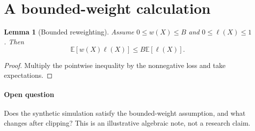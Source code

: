 \documentclass{article}
\newtheorem{lemma}{Lemma}
\begin{document}
\section*{A bounded-weight calculation}
\setcounter{lemma}{1}
\begin{lemma}[Bounded reweighting]
Assume $0 \leq w(X) \leq B$ and $0 \leq \ell(X) \leq 1$. Then
\[\mathbb{E}[w(X)\ell(X)] \leq B\mathbb{E}[\ell(X)].\]
\end{lemma}
\begin{proof}
Multiply the pointwise inequality by the nonnegative loss and take expectations.
\end{proof}
\paragraph{Open question}Does the synthetic simulation satisfy the bounded-weight assumption, and what changes after clipping?
This is an illustrative algebraic note, not a research claim.
\end{document}
